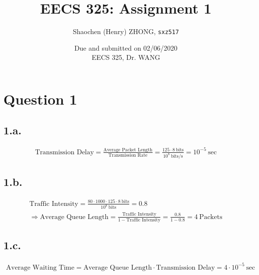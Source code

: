 \documentclass[12pt]{article}
\newcommand{\inlinecode}{\texttt}
\begin{document}
\title{\textbf{EECS 325: Assignment 1}}

\author{Shaochen (Henry) ZHONG, \inlinecode{sxz517} }
\date{Due and submitted on 02/06/2020 \\ EECS 325, Dr. WANG}
\maketitle

\section{Question 1}

\subsection{1.a.}

\begin{gather}
    \text{Transmission Delay} = \frac{\text{Average Packet Length}}{\text{Transmission Rate}} = \frac{125\cdot 8 \  \text{bits}}{10^8 \ \text{bits/s}} = 10^{-5} \ \text{sec}
\end{gather}

\subsection{1.b.}

\begin{gather}
    \text{Traffic Intensity} =  \frac{80 \cdot 1000 \cdot 125 \cdot 8 \  \text{bits}}{10^8 \ \text{bits}} = 0.8 \\
    \Longrightarrow \text{Average Queue Length} = \frac{\text{Traffic Intensity}}{\text{$1 - $Traffic Intensity}} = \frac{0.8}{1-0.8} = 4 \ \text{Packets}
\end{gather}

\subsection{1.c.}


\begin{gather}
    \text{Average Waiting Time} = \text{Average Queue Length} \cdot \text{Transmission Delay}  = 4 \cdot 10^{-5} \ \text{sec}
\end{gather}
\end{document}
